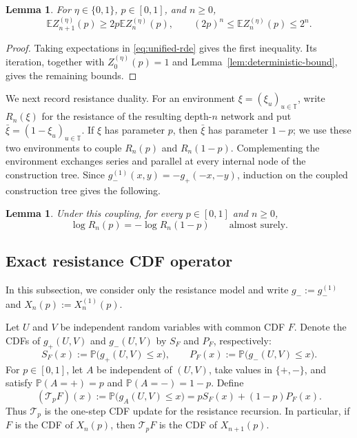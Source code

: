 \documentclass[12pt,preprint]{amsart}
\numberwithin{equation}{section}
\theoremstyle{plain}
\newtheorem{lemma}[theorem]{Lemma}
\theoremstyle{definition}
\newcommand{\E}{\mathbb E}
\newcommand{\Pp}{\mathbb P}
\begin{document}
\begin{lemma}
\label{lem:first-moment-bounds}
For $\eta\in\{0,1\}$, $p\in[0,1]$, and $n\ge0$,
\begin{equation}
 \E Z_{n+1}^{(\eta)}(p)\ge2p\E Z_n^{(\eta)}(p),
 \qquad
 (2p)^n\le\E Z_n^{(\eta)}(p)\le2^n.
 \label{eq:first-moment-recursion}
\end{equation}
\end{lemma}

\begin{proof}
Taking expectations in \eqref{eq:unified-rde} gives the first inequality.
Its iteration, together with $Z_0^{(\eta)}(p)=1$ and
Lemma~\ref{lem:deterministic-bound}, gives the remaining bounds.
\end{proof}

We next record resistance duality.  For an
environment $\xi=(\xi_u)_{u\in\mathbb T}$, write $R_n(\xi)$ for the
resistance of the resulting depth-$n$ network and put
$\bar\xi=(1-\xi_u)_{u\in\mathbb T}$.  If $\xi$ has parameter $p$, then
$\bar\xi$ has parameter $1-p$; we use these two environments to couple
$R_n(p)$ and $R_n(1-p)$.  Complementing the environment exchanges series
and parallel at every internal node of the construction tree.  Since
$g_-^{(1)}(x,y)=-g_+(-x,-y)$, induction on the coupled construction
tree gives the following.

\begin{lemma}
\label{lem:resistance-duality}
Under this coupling, for every $p\in[0,1]$ and $n\ge0$,
\begin{equation}
 \log R_n(p)=-\log R_n(1-p)
 \qquad\text{almost surely}.
 \label{eq:resistance-duality}
\end{equation}
\end{lemma}

\subsection{Exact resistance CDF operator}
\label{sec:cdf-operator}

In this subsection, we consider only the resistance model and write
$g_-:=g_-^{(1)}$ and $X_n(p):=X_n^{(1)}(p)$.

Let $U$ and $V$ be independent random variables with common CDF $F$.  Denote
the CDFs of $g_+(U,V)$ and $g_-(U,V)$ by $S_F$ and $P_F$, respectively:
\[
 S_F(x):=\Pp\bigl(g_+(U,V)\le x\bigr),
 \qquad
 P_F(x):=\Pp\bigl(g_-(U,V)\le x\bigr).
\]
For $p\in[0,1]$, let $A$ be independent of $(U,V)$, take values in
$\{+,-\}$, and satisfy $\Pp(A=+)=p$ and $\Pp(A=-)=1-p$.  Define
\begin{equation}
 (\mathcal T_pF)(x):=\Pp\bigl(g_A(U,V)\le x\bigr)
 =pS_F(x)+(1-p)P_F(x).
 \label{eq:CDF-operator-definition}
\end{equation}
Thus $\mathcal T_p$ is the one-step CDF update for the resistance recursion.
In particular, if $F$ is the CDF of $X_n(p)$, then $\mathcal T_pF$ is the
CDF of $X_{n+1}(p)$.
\end{document}
